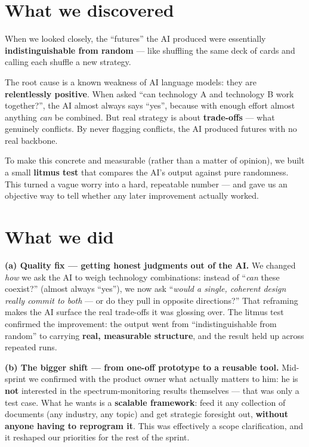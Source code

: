 \documentclass[11pt,a4paper]{article}
\begin{document}
\section{What we discovered}
When we looked closely, the ``futures'' the AI produced were essentially
\textbf{indistinguishable from random} --- like shuffling the same deck of cards and calling
each shuffle a new strategy.

The root cause is a known weakness of AI language models: they are \textbf{relentlessly
positive}. When asked ``can technology A and technology B work together?'', the AI almost always
says ``yes'', because with enough effort almost anything \emph{can} be combined. But real
strategy is about \textbf{trade-offs} --- what genuinely conflicts. By never flagging conflicts,
the AI produced futures with no real backbone.

To make this concrete and measurable (rather than a matter of opinion), we built a small
\textbf{litmus test} that compares the AI's output against pure randomness. This turned a vague
worry into a hard, repeatable number --- and gave us an objective way to tell whether any later
improvement actually worked.

\section{What we did}
\textbf{(a) Quality fix --- getting honest judgments out of the AI.}
We changed \emph{how} we ask the AI to weigh technology combinations: instead of ``\emph{can}
these coexist?'' (almost always ``yes''), we now ask ``\emph{would a single, coherent design
really commit to both} --- or do they pull in opposite directions?'' That reframing makes the AI
surface the real trade-offs it was glossing over. The litmus test confirmed the improvement: the
output went from ``indistinguishable from random'' to carrying \textbf{real, measurable
structure}, and the result held up across repeated runs.

\textbf{(b) The bigger shift --- from one-off prototype to a reusable tool.}
Mid-sprint we confirmed with the product owner what actually matters to him: he is \textbf{not}
interested in the spectrum-monitoring results themselves --- that was only a test case. What he
wants is a \textbf{scalable framework}: feed it any collection of documents (any industry, any
topic) and get strategic foresight out, \textbf{without anyone having to reprogram it}. This was
effectively a scope clarification, and it reshaped our priorities for the rest of the sprint.
\end{document}
